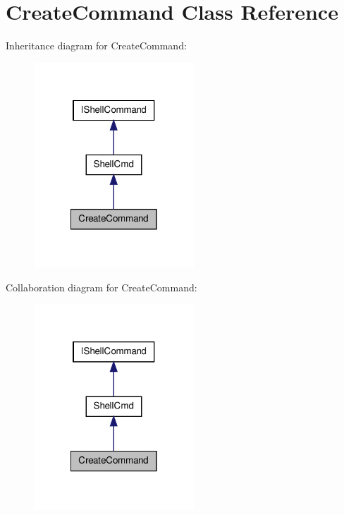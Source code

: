 \hypertarget{class_sec_plus_1_1_create_command}{
\section{CreateCommand Class Reference}
\label{class_sec_plus_1_1_create_command}
}


Inheritance diagram for CreateCommand:\nopagebreak
\begin{figure}[H]
\begin{center}
\leavevmode
\includegraphics[width=170pt]{class_sec_plus_1_1_create_command__inherit__graph}
\end{center}
\end{figure}


Collaboration diagram for CreateCommand:\nopagebreak
\begin{figure}[H]
\begin{center}
\leavevmode
\includegraphics[width=170pt]{class_sec_plus_1_1_create_command__coll__graph}
\end{center}
\end{figure}
